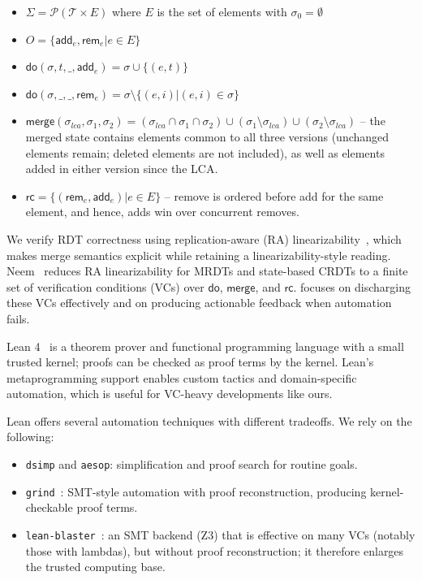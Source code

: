 \documentclass[sigplan,twocolumn,accept]{acmart}
\newcommand{\F}[1]{\mathsf{#1}}
\begin{document}
\begin{itemize}
    \item $\Sigma = \mathcal{P}(\mathcal{T} \times E)$ where $E$ is the set of elements with $\sigma_0 = \emptyset$
    \item $O = \{\F{add}_e, \F{rem}_e | e \in E\}$
    \item $\F{do}(\sigma,t,\_,\F{add}_e) = \sigma \cup \{(e,t)\}$
    \item $\F{do}(\sigma,\_,\_,\F{rem}_e) = \sigma \setminus \{(e,i) | (e,i) \in \sigma\}$
    \item $\F{merge}(\sigma_{lca},\sigma_1,\sigma_2) = (\sigma_{lca} \cap \sigma_1 \cap \sigma_2) \cup (\sigma_1 \setminus \sigma_{lca}) \cup (\sigma_2 \setminus \sigma_{lca})$ -- the merged state contains elements common to all three versions (unchanged elements remain; deleted elements are not included), as well as elements added in either version since the LCA.
    \item $\F{rc} = \{(\F{rem}_e,\F{add}_e) | e \in E\}$ -- remove is ordered before add for the same element, and hence, adds win over concurrent removes.
\end{itemize}

We verify RDT correctness using replication-aware (RA) linearizability~\cite{WangRALin}, which makes merge semantics explicit while retaining a linearizability-style reading. Neem~\cite{Neem} reduces RA linearizability for MRDTs and state-based CRDTs to a finite set of verification conditions (VCs) over $\F{do}$, $\F{merge}$, and $\F{rc}$. \sal focuses on discharging these VCs effectively and on producing actionable feedback when automation fails.

Lean 4~\cite{lean_whitepaper} is a theorem prover and functional programming language with a small trusted kernel; proofs can be checked as proof terms by the kernel. Lean's metaprogramming support enables custom tactics and domain-specific automation, which is useful for VC-heavy developments like ours.

Lean offers several automation techniques with different tradeoffs. We rely on the following:
\begin{itemize}
    \item \texttt{dsimp} and \texttt{aesop}: simplification and proof search for routine goals.
    \item \texttt{grind}~\cite{lean_grind}: SMT-style automation with proof reconstruction, producing kernel-checkable proof terms.
    \item \texttt{lean-blaster}~\cite{lean_blaster}: an SMT backend (Z3) that is effective on many VCs (notably those with lambdas), but without proof reconstruction; it therefore enlarges the trusted computing base.
\end{itemize}
\end{document}
